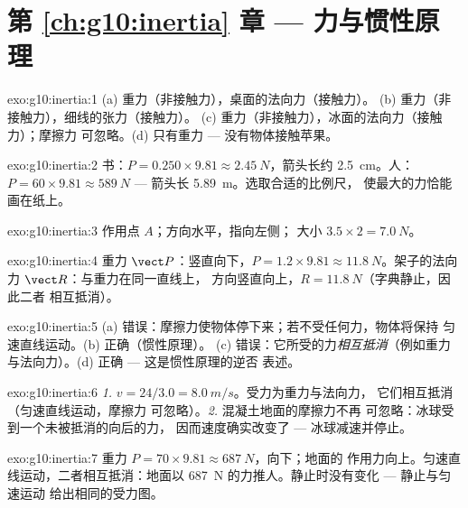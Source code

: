 \section*{第 \ref{ch:g10:inertia} 章 --- 力与惯性原理}

\begin{solution}{exo:g10:inertia:1}
(a) 重力（非接触力），桌面的法向力（接触力）。
(b) 重力（非接触力），细线的张力（接触力）。
(c) 重力（非接触力），冰面的法向力（接触力）；摩擦力
可忽略。(d) 只有重力 --- 没有物体接触苹果。
\end{solution}

\begin{solution}{exo:g10:inertia:2}
书：$P = 0.250 \times 9.81 \approx \qty{2.45}{N}$，箭头长约
\qty{2.5}{cm}。人：$P = 60 \times 9.81 \approx \qty{589}{N}$
--- 箭头长 \qty{5.89}{m}。选取合适的比例尺，
使最大的力恰能画在纸上。
\end{solution}

\begin{solution}{exo:g10:inertia:3}
作用点 $A$；方向水平，指向左侧；
大小 $3.5 \times 2 = \qty{7.0}{N}$。
\end{solution}

\begin{solution}{exo:g10:inertia:4}
重力 $\vect P$：竖直向下，$P = 1.2 \times 9.81 \approx
\qty{11.8}{N}$。架子的法向力 $\vect R$：与重力在同一直线上，
方向竖直向上，$R = \qty{11.8}{N}$（字典静止，因此二者
相互抵消）。
\end{solution}

\begin{solution}{exo:g10:inertia:5}
(a) 错误：摩擦力使物体停下来；若不受任何力，物体将保持
匀速直线运动。(b) 正确（惯性原理）。
(c) 错误：它所受的力\emph{相互抵消}（例如重力
与法向力）。(d) 正确 --- 这是惯性原理的逆否
表述。
\end{solution}

\begin{solution}{exo:g10:inertia:6}
\emph{1.} $v = 24/3.0 = \qty{8.0}{m/s}$。受力为重力与法向力，
它们相互抵消（匀速直线运动，摩擦力
可忽略）。\emph{2.} 混凝土地面的摩擦力不再
可忽略：冰球受到一个未被抵消的向后的力，
因而速度确实改变了 --- 冰球减速并停止。
\end{solution}

\begin{solution}{exo:g10:inertia:7}
重力 $P = 70 \times 9.81 \approx \qty{687}{N}$，向下；地面的
作用力向上。匀速直线运动，二者相互抵消：地面以
\qty{687}{N} 的力推人。静止时没有变化 --- 静止与匀速运动
给出相同的受力图。
\end{solution}

